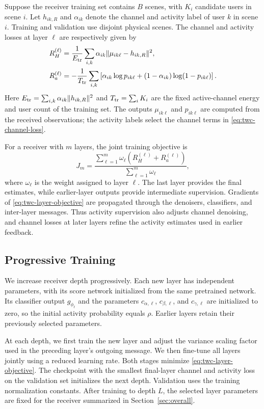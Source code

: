 Suppose the receiver training set contains $B$ scenes, with $K_i$
candidate users in scene $i$. Let $h_{ik,R}$ and $\alpha_{ik}$
denote the channel and activity label of user $k$ in scene $i$.
Training and validation use disjoint physical scenes.
The channel and activity losses at layer $\ell$ are respectively
given by
\begin{align}
 R_H^{(\ell)}&=\frac{1}{E_{\rm tr}}\sum_{i,k}
       \alpha_{ik}\|\mu_{ik\ell}-h_{ik,R}\|^2,
 \label{eq:twc-channel-loss}\\
 R_a^{(\ell)}&=-\frac{1}{T_{\rm tr}}\sum_{i,k}
       \left[\alpha_{ik}\log p_{ik\ell}
       +(1-\alpha_{ik})\log(1-p_{ik\ell})\right].
 \label{eq:twc-activity-loss}
\end{align}
Here $E_{\rm tr}=\sum_{i,k}\alpha_{ik}\|h_{ik,R}\|^2$ and
$T_{\rm tr}=\sum_i K_i$ are the fixed active-channel energy and user
count of the training set. The outputs $\mu_{ik\ell}$ and $p_{ik\ell}$
are computed from the received observations; the activity labels
select the channel terms in \eqref{eq:twc-channel-loss}.

For a receiver with $m$ layers, the joint training objective is
\begin{equation}
 J_m=\frac{\sum_{\ell=1}^{m}\omega_\ell
                  \left(R_H^{(\ell)}+R_a^{(\ell)}\right)}
                 {\sum_{\ell=1}^{m}\omega_\ell},
 \label{eq:twc-layer-objective}
\end{equation}
where $\omega_\ell$ is the weight assigned to layer $\ell$.
The last layer provides the final estimates, while earlier-layer
outputs provide intermediate supervision.
Gradients of \eqref{eq:twc-layer-objective} are propagated through
the denoisers, classifiers, and inter-layer messages. Thus activity
supervision also adjusts channel denoising, and channel losses at later
layers refine the activity estimates used in earlier feedback.

\subsection{Progressive Training}

We increase receiver depth progressively. Each new layer has independent
parameters, with its score network initialized from the same
pretrained network.
Its classifier output $g_{\phi_\ell}$ and the parameters $c_{\alpha,\ell}$,
$c_{\beta,\ell}$, and $c_{\gamma,\ell}$ are initialized to zero,
so the initial activity probability equals $\rho$.
Earlier layers retain their previously selected parameters.

At each depth, we first train the new layer and adjust the variance
scaling factor used in the preceding layer's outgoing message. We then
fine-tune all layers jointly using a reduced learning rate. Both stages minimize
\eqref{eq:twc-layer-objective}. The checkpoint with the smallest
final-layer channel and activity loss on the validation set initializes
the next depth. Validation uses the training normalization constants.
After training to depth $L$, the selected layer parameters are fixed
for the receiver summarized in Section~\ref{sec:overall}.

